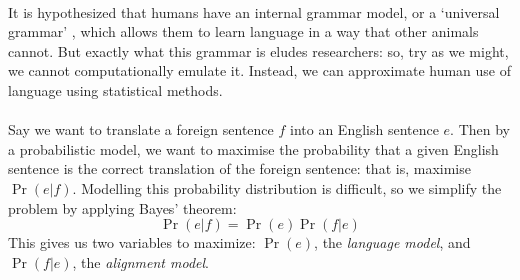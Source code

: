 \paragraph{}{It is hypothesized that humans have an internal grammar
  model, or a `universal grammar' \cite{chomsky}, which allows them to
  learn language in a way that other animals cannot. But exactly what
  this grammar is eludes researchers: so, try as we might, we cannot
  computationally emulate it. Instead, we can approximate human use of
  language using statistical methods.}
\paragraph{}{Say we want to translate a foreign sentence $f$ into an
  English sentence $e$. Then by a probabilistic model, we want to
  maximise the probability that a given English sentence is the
  correct translation of the foreign sentence: that is, maximise
  $\Pr(e|f)$.\cite{smt} Modelling this probability distribution is
  difficult, so we simplify the problem by applying Bayes' theorem:
  \cite{bayes}
  $$ \Pr(e|f)= \Pr(e)\Pr(f|e)$$ This gives us two variables to
  maximize: $\Pr(e)$, the {\it language model}, and $\Pr(f|e)$, the
  {\it alignment model}.}
